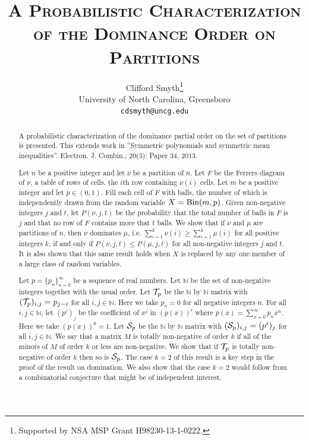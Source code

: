 \documentclass[12pt]{article}
\title{\scshape A Probabilistic Characterization of the Dominance Order on Partitions}
\author{Clifford Smyth\thanks{Supported by NSA MSP Grant H98230-13-1-0222.}\\ University of North Carolina, Greensboro \\ {\tt cdsmyth@uncg.edu}}
\begin{document}
\maketitle

\begin{abstract}
A probabilistic characterization of the dominance partial order on the set of partitions is presented.  This extends work in ''Symmetric polynomials and symmetric mean inequalities''. Electron. J. Combin., 20(3): Paper 34, 2013.

Let $n$ be a positive integer and let $\nu$ be a partition of $n$.  Let $F$ be the Ferrers diagram of $\nu$, a table of rows of cells, the $i$th row containing $\nu(i)$ cells.   Let $m$ be a positive integer and let $p \in (0,1)$.  Fill each cell of $F$ with balls, the number of which is independently drawn from the random variable $X = \text{Bin}(m,p)$.  Given non-negative integers $j$ and $t$, let $P(\nu,j,t)$ be the probability that the total number of balls in $F$ is $j$ and that no row of $F$ contains more that $t$ balls.  We show that if $\nu$ and $\mu$ are partitions of $n$, then $\nu$ dominates $\mu$, i.e. $\sum_{i=1}^k \nu(i) \geq \sum_{i=1}^k \mu(i)$ for all positive integers $k$, if and only if $P(\nu,j,t) \leq P(\mu,j,t)$ for all non-negative integers $j$ and $t$.  It is also shown that this same result holds when $X$ is replaced by any one member of a large class of random variables.

Let $p = \{p_n\}_{n=0}^\infty$ be a sequence of real numbers.  Let $\mathbb{N}$ be the set of non-negative integers together with the usual order.  Let ${\cal T}_p$ be the $\mathbb{N}$ by $\mathbb{N}$ matrix with $({\cal T}_p)_{i,j} = p_{j-i}$ for all $i, j \in \mathbb{N}$. Here we take $p_n = 0$ for all negative integers $n$. For all $i,j \in \mathbb{N}$, let $(p^i)_j$ be the coefficient of $x^j$ in $(p(x))^i$ where $p(x) = \sum_{n=0}^\infty p_n x^n$. Here we take $(p(x))^0 = 1$.  Let ${\cal S}_p$ be the $\mathbb{N}$ by $\mathbb{N}$ matrix with $({\cal S}_p)_{i,j} = (p^i)_j$ for all $i, j \in \mathbb{N}$. We say that a matrix $M$ is totally non-negative of order $k$ if all of the minors of $M$ of order $k$ or less are non-negative.  We show that if ${\cal T}_p$ is totally non-negative of order $k$ then so is ${\cal S}_p$.  The case $k=2$ of this result is a key step in the proof of the result on domination.  We also show that the case $k=2$ would follow from a combinatorial conjecture that might be of independent interest.
\end{abstract}
\end{document}
